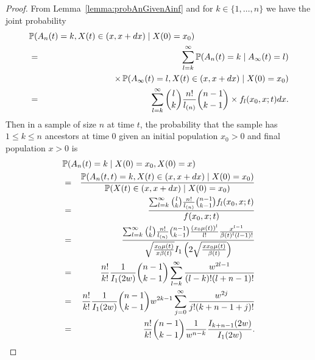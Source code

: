 \documentclass[preprint,12pt]{elsarticle}
\begin{document}
\begin{proof}
From Lemma~\ref{lemma:probAnGivenAinf} and for $k \in \{1, \ldots, n\}$ we have the joint probability 
\begin{eqnarray*}
\lefteqn{\mathbb{P}(A_n(t) = k, X(t) \in(x, x + dx) \mid X(0) = x_0) } \\
	& = & \sum_{l = k}^\infty \mathbb{P}(A_n(t) = k \mid A_\infty(t) = l)   \\
	& & \qquad\qquad\qquad\qquad \times \, \mathbb{P}(A_\infty(t) = l, X(t) \in(x, x + dx) \mid X(0) = x_0) \\
	& = & \sum_{l = k}^\infty \binom{l}{k} \frac{n!}{l_{(n)}} \binom{n - 1}{k - 1} \times 
							f_l(x_0, x; t) dx. 
\end{eqnarray*}
Then in a sample of size $n$ at time $t$, the probability that the sample has $1 \le k \le n$ ancestors at time 0 given an initial 
population $x_0 > 0$ and final population $x > 0$ is 
\begin{eqnarray*}	%
\lefteqn{\mathbb{P}(A_n(t) = k \mid X(0) = x_0, X(0) = x) } \nonumber \\
	& = & \frac{\mathbb{P}(A_n(t, t) = k, X(t) \in(x, x + dx) \mid X(0) = x_0)}
			{\mathbb{P}(X(t) \in(x, x + dx) \mid X(0) = x_0) } \nonumber \\
	& = & \frac{\sum_{l = k}^\infty \binom{l}{k} \frac{n!}{l_{(n)}} \binom{n - 1}{k - 1} f_l(x_0, x; t)} {f(x_0, x; t)} \nonumber \\
	& = & \frac{\sum_{l = k}^\infty \binom{l}{k} \frac{n!}{l_{(n)}} \binom{n - 1}{k - 1}\frac{(x_0 \mu(t))^l}{l!} \frac{x^{l - 1}}{\beta(t)^l (l - 1)!}}
							{\sqrt{\frac{x_0\mu(t)}{x\beta(t)}} I_1 \left( 2\sqrt{\frac{xx_0\mu(t)}{\beta(t)}}\right)} \nonumber \\ 
	& = & \frac{n!}{k!} \frac{1}{I_1(2w)} \binom{n - 1}{k - 1} \sum_{l = k}^\infty \frac{w^{2l - 1}}{(l - k)! (l + n - 1)!} \nonumber \\
	& = & \frac{n!}{k!} \frac{1}{I_1(2w)} \binom{n - 1}{k - 1}w^{2k - 1} \sum_{j = 0}^\infty \frac{w^{2j}}{j!(k + n - 1 + j)!} \nonumber \\
	& = & \frac{n!}{k!} \binom{n - 1}{k - 1}\frac{1}{w^{n - k}} \frac{I_{k + n - 1}(2w)}{I_1(2w)}.   
\end{eqnarray*}
\end{proof}
\end{document}
